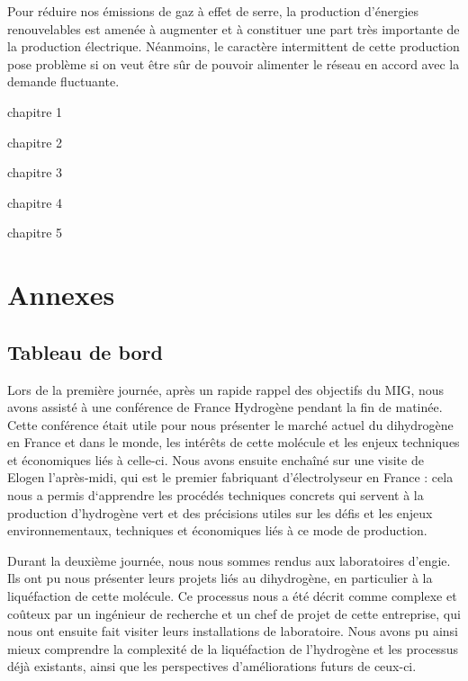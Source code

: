 \documentclass[11pt,french,a4paper]{article}
\makeatletter
\newcommand\backmatter{%
    \clearpage
   }
\makeatother
\begin{document}

Pour réduire nos émissions de gaz à effet de serre, la production d’énergies renouvelables est amenée à augmenter et à constituer une part très importante de la production électrique. Néanmoins, le caractère intermittent de cette production pose problème si on veut être sûr de pouvoir alimenter le réseau en accord avec la demande fluctuante. 

chapitre 1

chapitre 2

chapitre 3

chapitre 4

chapitre 5



\newpage

\backmatter

\section*{Annexes} 

\subsection*{Tableau de bord}
Lors de la première journée,  après un rapide rappel des objectifs du MIG, nous avons assisté à une conférence de France Hydrogène pendant la fin de matinée. Cette conférence était utile pour nous présenter le marché actuel du dihydrogène en France et dans le monde, les intérêts de cette molécule et les enjeux techniques et économiques liés à celle-ci. 
Nous avons ensuite enchaîné sur une visite de Elogen l’après-midi, qui est le premier fabriquant d’électrolyseur en France : cela nous a permis d‘apprendre les procédés techniques concrets qui servent à la production d’hydrogène vert et des précisions utiles sur les défis et les enjeux environnementaux, techniques et économiques liés à ce mode de production. 

Durant la deuxième journée, nous nous sommes rendus aux laboratoires d’engie. Ils ont pu nous présenter leurs projets liés au dihydrogène, en particulier à la liquéfaction de cette molécule. Ce processus nous a été décrit comme complexe et coûteux par un ingénieur de recherche et un chef de projet de cette entreprise, qui nous ont ensuite fait visiter leurs installations de laboratoire. Nous avons pu ainsi mieux comprendre la complexité de la liquéfaction de l’hydrogène et les processus déjà existants, ainsi que les perspectives d’améliorations futurs de ceux-ci.
\end{document}

